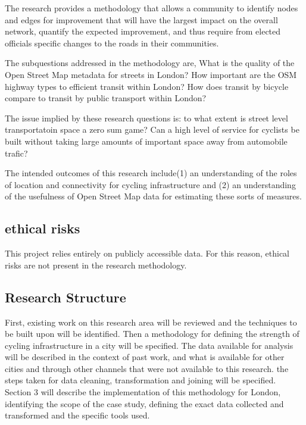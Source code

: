 The research provides a methodology that allows a community to identify nodes and edges for improvement that will have the largest impact on the overall network, quantify the expected improvement, and thus require from elected officials specific changes to the roads in their communities. 

The subquestions addressed in the methodology are, What is the quality of the Open Street Map metadata for streets in London? How important are the OSM highway types to efficient transit within London? How does transit by bicycle compare to transit by public transport within London? 

The issue implied by these research questions is: to what extent is street level transportatoin space a zero sum game? Can a high level of service for cyclists be built without taking large amounts of important space away from automobile trafic? 

The intended outcomes of this research include(1) an understanding of the roles of location and connectivity for cycling infrastructure and (2) an understanding of the usefulness of Open Street Map data for estimating these sorts of measures. 


\subsection{ethical risks}

This project relies entirely on publicly accessible data. For this reason, ethical risks are not present in the research methodology.  



\subsection{Research Structure}

First, existing work on this research area will be reviewed and the techniques to be built upon will be identified.  Then a methodology for defining the strength of cycling infrastructure in a city will be specified. The data available for analysis will be described in the context of past work, and what is available for other cities and through other channels that were not available to this research. the steps taken for data cleaning, transformation and joining will be specified. Section 3 will describe the implementation of this methodology for London, identifying the scope of the case study, defining the exact data collected and transformed and the specific tools used. 

